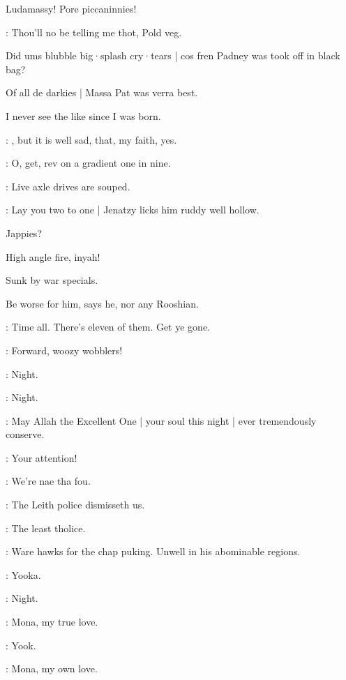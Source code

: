 \begin{omitted}
Ludamassy!
Pore piccaninnies!
\end{omitted}

\crotthers:
Thou'll no be telling me thot,
Pold veg.

\begin{omitted}
Did ums blubble big·splash cry·tears |
cos fren Padney was took off in black bag?

Of all de darkies |
Massa Pat was verra best.

I never see the like since I was born.
\end{omitted}

\dixon:
,
but it is well sad,
that,
my faith,
yes.

\stephen:
O,
get,
rev on a gradient one in nine.

\lynch:
Live axle drives are souped.

\lenehan:
Lay you two to one |
Jenatzy licks him ruddy well hollow.

\begin{omitted}
Jappies?

High angle fire,
inyah!

Sunk by war specials.

Be worse for him,
says he,
nor any Rooshian.
\end{omitted}

\barman:
Time all.
There's eleven of them.
Get ye gone.

\lenehan:
Forward,
woozy wobblers!

\lynch:
Night.

\punch:
Night.

\dixon:
May Allah the Excellent One |
your soul this night |
ever tremendously conserve.


\lenehan:
Your attention!

\crotthers:
We're nae tha fou.

\lynch:
The Leith police dismisseth us.

\crotthers:
The least tholice.

\punch:
Ware hawks for the chap puking.
Unwell in his abominable regions.

\bystander:
Yooka.

\dixon:
Night.

\crotthers:
Mona,
my true love.

\bystander:
Yook.

\crotthers:
Mona,
my own love.

